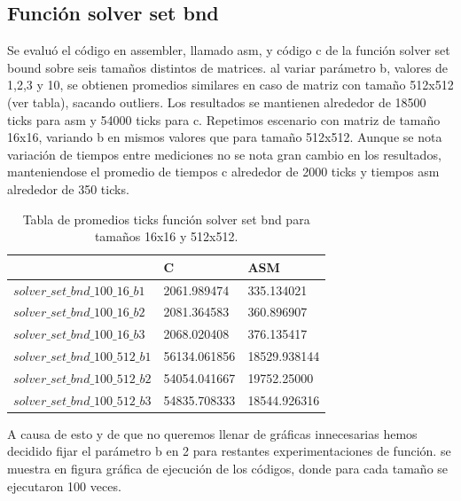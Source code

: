  
 
\subsection{Función solver set bnd}
 
Se evaluó el código en assembler, llamado asm, y código c de la función solver set bound sobre seis tamaños distintos de matrices. al variar parámetro b, valores de 1,2,3 y 10, se obtienen promedios similares en caso de matriz con tamaño 512x512 (ver tabla), sacando outliers. Los resultados se mantienen alrededor de 18500 ticks para asm y 54000 ticks para c. 
Repetimos escenario con matriz de tamaño 16x16, variando b en mismos valores que para tamaño 512x512. Aunque se nota 
variación de tiempos entre mediciones no se nota gran cambio en los resultados, manteniendose el promedio de tiempos c alrededor de 2000 ticks y tiempos asm alrededor de 350 ticks.
\begin{table}[htbp]
\begin{center}
\begin{tabular}{|l|l|l|}
\hline
  & C & ASM\\
\hline \hline
$solver\_set\_bnd\_100\_16\_b1$ & 2061.989474 & 335.134021\\ \hline
$solver\_set\_bnd\_100\_16\_b2$  & 2081.364583 & 360.896907\\ \hline
$solver\_set\_bnd\_100\_16\_b3$  & 2068.020408 & 376.135417 \\ 
\hline \hline
$solver\_set\_bnd\_100\_512\_b1$  & 56134.061856 & 18529.938144 \\ \hline

$solver\_set\_bnd\_100\_512\_b2$  & 54054.041667 & 19752.25000 \\ \hline

$solver\_set\_bnd\_100\_512\_b3$  &  54835.708333 & 18544.926316 \\ \hline

\end{tabular}
\caption{Tabla de promedios ticks función solver set bnd para tamaños 16x16 y 512x512.}
\end{center}
\end{table}
A causa de esto y de que no queremos llenar de gráficas innecesarias hemos decidido fijar el parámetro b en 2 para restantes experimentaciones de función. 
se muestra en figura gráfica de ejecución de los códigos, donde para cada tamaño se ejecutaron 100 veces.
